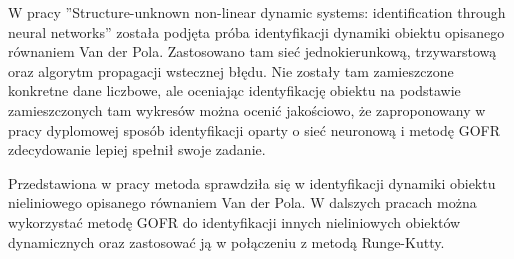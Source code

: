 W pracy ''Structure-unknown non-linear dynamic systems: identification through neural networks''\cite{Masri} została podjęta próba identyfikacji dynamiki obiektu opisanego równaniem Van der Pola. Zastosowano tam sieć jednokierunkową, trzywarstową oraz algorytm propagacji wstecznej błędu. Nie zostały tam zamieszczone konkretne dane liczbowe, ale oceniając identyfikację obiektu na podstawie zamieszczonych tam wykresów można ocenić jakościowo, że zaproponowany w pracy dyplomowej sposób identyfikacji oparty o sieć neuronową i metodę GOFR zdecydowanie lepiej spełnił swoje zadanie. 

Przedstawiona w pracy metoda sprawdziła się w identyfikacji dynamiki obiektu nieliniowego opisanego równaniem Van der Pola. W dalszych pracach można wykorzystać metodę GOFR do identyfikacji innych nieliniowych obiektów dynamicznych oraz zastosować ją w połączeniu z metodą Runge-Kutty.

\clearpage

